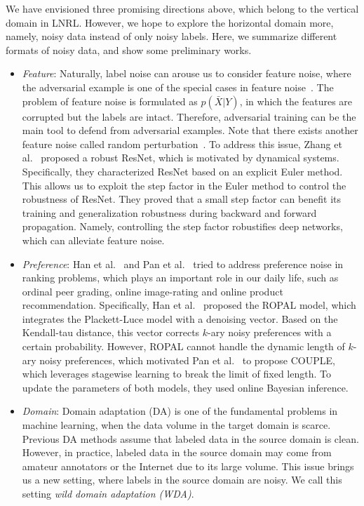 We have envisioned three promising directions above, which belong to the vertical domain in LNRL. However, we hope to explore the horizontal domain more, namely, noisy data instead of only noisy labels. Here, we summarize different formats of noisy data, and show some preliminary works.
\begin{itemize}[leftmargin=*]
\item 
\textit{Feature}:
Naturally, label noise can arouse us to consider feature noise, where the adversarial example is one of the special cases in feature noise~. The problem of feature noise is formulated as $p(\bar{X}|Y)$, in which the features are corrupted but the labels are intact.
Therefore, adversarial training can be the main tool to defend from adversarial examples. Note that there exists another feature noise called random perturbation~. To address this issue, Zhang et al.~ proposed a robust ResNet, which is motivated by dynamical systems. Specifically, they characterized ResNet based on an explicit Euler method. This allows us to exploit the step factor in the Euler method to control the robustness of ResNet. They  proved that a small step factor can benefit its training and generalization robustness during backward and forward propagation. Namely, controlling the step factor robustifies deep networks, which can alleviate feature noise.
\item \textit{Preference}:
Han et al.~ and Pan et al.~ tried to address preference noise in ranking problems,
which plays an important role in our daily life, such as ordinal peer grading, online image-rating and online product recommendation.
Specifically, Han et al.~ proposed the ROPAL model, which integrates the Plackett-Luce model with a denoising vector. Based on the Kendall-tau distance, this vector corrects $k$-ary noisy preferences with a certain probability. However, ROPAL cannot handle the dynamic length of $k$-ary noisy preferences, which motivated Pan et al.~ to propose COUPLE, which leverages stagewise learning to break the limit of fixed length. To update the parameters of both models, they used online Bayesian inference.
\item \textit{Domain}:
Domain adaptation (DA) is one of the fundamental problems in machine learning, when the data volume in the target domain is scarce. Previous DA methods assume that labeled data in the source domain is  clean. However, in practice, labeled data in the source domain may come from amateur annotators or the Internet due to its large volume. This issue brings us a new setting, where labels in the source domain are noisy. We call this setting \textit{wild domain adaptation (WDA)}.

\end{itemize}
